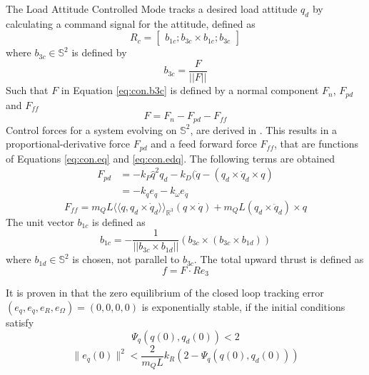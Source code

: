 The Load Attitude Controlled Mode tracks a desired load attitude $ q_d $ by calculating a command signal for the  attitude, defined as
\begin{equation}\label{eq:con.R}
R_c = \begin{bmatrix}
b_{1c}; b_{3c}\times b_{1c};b_{3c}
\end{bmatrix}
\end{equation}
where $ b_{3c} \in \mathbb{S}^2 $ is defined by 
\begin{equation}\label{eq:con.b3c}
b_{3c}=\frac{F}{||F||}
\end{equation}
Such that $ F $ in Equation \ref{eq:con.b3c} is defined by a normal component $ F_n $, $ F_{pd} $ and $ F_{ff}$
\begin{equation}\label{key}
F=F_n-F_{pd}-F_{ff}
\end{equation}
 Control forces for a system evolving on $ \mathbb{S}^2 $, are derived in \cite{Bullo2005}. 
 This results in a proportional-derivative force $ F_{pd} $ and a feed forward force $ F_{ff} $, that are functions of Equations \ref{eq:con.eq} and \ref{eq:con.edq}. The following terms are obtained
\begin{equation}\label{key}
\begin{aligned}
F_{pd}&=-k_P\hat{q}^2q_d-k_D(\dot{q}-(q_d\times\dot{q}_d\times q)\\
&=-k_qe_q-k_\omega e_{\dot{q}}
\end{aligned}
\end{equation}
\begin{equation}\label{key}
F_{ff}=m_QL\langle\langle q,q_d\times\dot{q}_d\rangle\rangle_{\mathbb{R}^3}(q\times \dot{q})+m_QL(q_d\times \ddot{q}_d)\times q
\end{equation}
The unit vector $ b_{1c} $ is defined as \cite{Lee2010d}
\begin{equation}\label{key}
b_{1c}=-\frac{1}{||b_{3c}\times b_{1d}||}(b_{3c}\times(b_{3c}\times b_{1d}))
\end{equation}
where $ b_{1d}\in \mathbb{S}^2 $ is chosen, not parallel to $ b_{3c} $.
The total upward thrust is defined as
\begin{equation}\label{key}
f=F\cdot Re_3
\end{equation}

It is proven in \cite{Sreenath2013c} that the zero equilibrium of the closed loop tracking error $ (e_q,e_{\dot{q}},e_R,e_\Omega)=(0,0,0,0) $ is exponentially stable, if the initial conditions satisfy
\begin{equation}\label{eq:dom3}
\Psi_q(q(0),q_d(0))<2
\end{equation}
\begin{equation}\label{eq:dom4}
\parallel e_{\dot{q}}(0)\parallel^2<\frac{2}{m_QL}{k_R}(2-\Psi_q(q(0),q_d(0)))
\end{equation}

